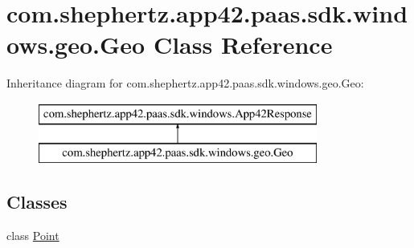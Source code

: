 \hypertarget{classcom_1_1shephertz_1_1app42_1_1paas_1_1sdk_1_1windows_1_1geo_1_1_geo}{\section{com.\+shephertz.\+app42.\+paas.\+sdk.\+windows.\+geo.\+Geo Class Reference}
\label{classcom_1_1shephertz_1_1app42_1_1paas_1_1sdk_1_1windows_1_1geo_1_1_geo}
}
Inheritance diagram for com.\+shephertz.\+app42.\+paas.\+sdk.\+windows.\+geo.\+Geo\+:\begin{figure}[H]
\begin{center}
\leavevmode
\includegraphics[height=2.000000cm]{classcom_1_1shephertz_1_1app42_1_1paas_1_1sdk_1_1windows_1_1geo_1_1_geo}
\end{center}
\end{figure}
\subsection*{Classes}
\begin{DoxyCompactItemize}
\item 
class \hyperlink{classcom_1_1shephertz_1_1app42_1_1paas_1_1sdk_1_1windows_1_1geo_1_1_geo_1_1_point}{Point}
\end{DoxyCompactItemize}
